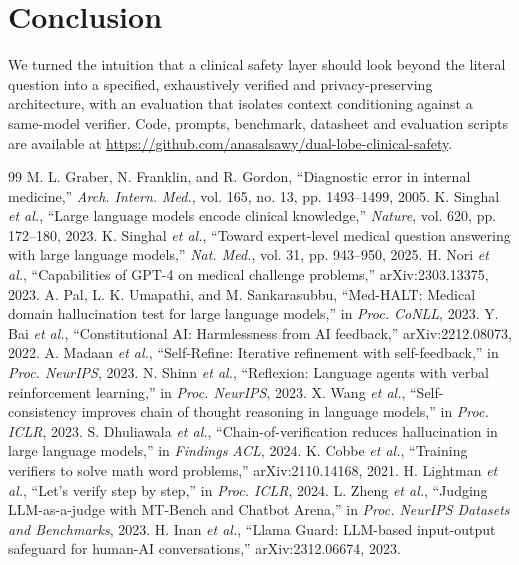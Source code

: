 \documentclass[journal]{IEEEtran}
\begin{document}
\section{Conclusion}
We turned the intuition that a clinical safety layer should look beyond the literal question into a specified, exhaustively verified and privacy-preserving architecture, with an evaluation that isolates context conditioning against a same-model verifier. Code, prompts, benchmark, datasheet and evaluation scripts are available at \url{https://github.com/anasalsawy/dual-lobe-clinical-safety}.

\begin{thebibliography}{99}
 M. L. Graber, N. Franklin, and R. Gordon, ``Diagnostic error in internal medicine,'' \emph{Arch. Intern. Med.}, vol. 165, no. 13, pp. 1493--1499, 2005.
 K. Singhal \emph{et al.}, ``Large language models encode clinical knowledge,'' \emph{Nature}, vol. 620, pp. 172--180, 2023.
 K. Singhal \emph{et al.}, ``Toward expert-level medical question answering with large language models,'' \emph{Nat. Med.}, vol. 31, pp. 943--950, 2025.
 H. Nori \emph{et al.}, ``Capabilities of GPT-4 on medical challenge problems,'' arXiv:2303.13375, 2023.
 A. Pal, L. K. Umapathi, and M. Sankarasubbu, ``Med-HALT: Medical domain hallucination test for large language models,'' in \emph{Proc. CoNLL}, 2023.
 Y. Bai \emph{et al.}, ``Constitutional AI: Harmlessness from AI feedback,'' arXiv:2212.08073, 2022.
 A. Madaan \emph{et al.}, ``Self-Refine: Iterative refinement with self-feedback,'' in \emph{Proc. NeurIPS}, 2023.
 N. Shinn \emph{et al.}, ``Reflexion: Language agents with verbal reinforcement learning,'' in \emph{Proc. NeurIPS}, 2023.
 X. Wang \emph{et al.}, ``Self-consistency improves chain of thought reasoning in language models,'' in \emph{Proc. ICLR}, 2023.
 S. Dhuliawala \emph{et al.}, ``Chain-of-verification reduces hallucination in large language models,'' in \emph{Findings ACL}, 2024.
 K. Cobbe \emph{et al.}, ``Training verifiers to solve math word problems,'' arXiv:2110.14168, 2021.
 H. Lightman \emph{et al.}, ``Let's verify step by step,'' in \emph{Proc. ICLR}, 2024.
 L. Zheng \emph{et al.}, ``Judging LLM-as-a-judge with MT-Bench and Chatbot Arena,'' in \emph{Proc. NeurIPS Datasets and Benchmarks}, 2023.
 H. Inan \emph{et al.}, ``Llama Guard: LLM-based input-output safeguard for human-AI conversations,'' arXiv:2312.06674, 2023.

\end{thebibliography}
\end{document}
